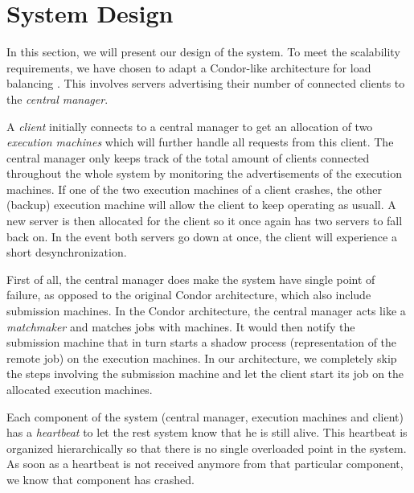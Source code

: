 \documentclass[a4paper,10pt]{article}
\begin{document}
\section{System Design}
\label{sec:design}

In this section, we will present our design of the system.
To meet the scalability requirements, we have chosen to adapt a Condor-like architecture for load balancing \cite{epema1996worldwide}.
This involves servers advertising their number of connected clients to the \emph{central manager}.

A \emph{client} initially connects to a central manager to get an allocation of two \emph{execution machines} which will further handle all requests from this client.
The central manager only keeps track of the total amount of clients connected throughout the whole system by monitoring the advertisements of the execution machines.
If one of the two execution machines of a client crashes, the other (backup) execution machine will allow the client to keep operating as usuall.
A new server is then allocated for the client so it once again has two servers to fall back on.
In the event both servers go down at once, the client will experience a short desynchronization.

First of all, the central manager does make the system have single point of failure,
as opposed to the original Condor architecture, which also include submission machines.
In the Condor architecture, the central manager acts like a \emph{matchmaker} and matches jobs with machines.
It would then notify the submission machine that in turn starts a shadow process (representation of the remote job) on the execution machines.
In our architecture, we completely skip the steps involving the submission machine and let the client start its job on the allocated execution machines.

Each component of the system (central manager, execution machines and client) has a \emph{heartbeat} to let the rest system know that he is still alive.
This heartbeat is organized hierarchically so that there is no single overloaded point in the system.
As soon as a heartbeat is not received anymore from that particular component, we know that component has crashed.
\end{document}
